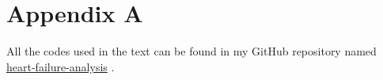 \chapter{Appendix A}
All the codes used in the text can be found in my GitHub repository named \href{https://github.com/ARna06/heart-failure-analysis}{heart-failure-analysis} \href{https://github.com/ARna06/heart-failure-analysis}{\faGithubSquare}.